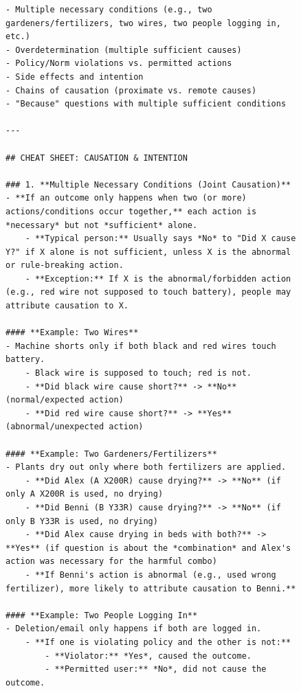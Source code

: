\begin{figure}[t]
\centering
\begin{tcolorbox}[title=Cheat Sheet for Causal Judgement (1/2), colback=gray!10, colframe=black!70, boxrule=0.5pt, top=0pt, bottom=0pt, left=0pt, right=0pt, arc=0.8mm, width=1.0\textwidth]
\scriptsize
\begin{lstlisting}
- Multiple necessary conditions (e.g., two gardeners/fertilizers, two wires, two people logging in, etc.)
- Overdetermination (multiple sufficient causes)
- Policy/Norm violations vs. permitted actions
- Side effects and intention
- Chains of causation (proximate vs. remote causes)
- "Because" questions with multiple sufficient conditions

---

## CHEAT SHEET: CAUSATION & INTENTION

### 1. **Multiple Necessary Conditions (Joint Causation)**
- **If an outcome only happens when two (or more) actions/conditions occur together,** each action is *necessary* but not *sufficient* alone.
    - **Typical person:** Usually says *No* to "Did X cause Y?" if X alone is not sufficient, unless X is the abnormal or rule-breaking action.
    - **Exception:** If X is the abnormal/forbidden action (e.g., red wire not supposed to touch battery), people may attribute causation to X.

#### **Example: Two Wires**
- Machine shorts only if both black and red wires touch battery.
    - Black wire is supposed to touch; red is not.
    - **Did black wire cause short?** -> **No** (normal/expected action)
    - **Did red wire cause short?** -> **Yes** (abnormal/unexpected action)

#### **Example: Two Gardeners/Fertilizers**
- Plants dry out only where both fertilizers are applied.
    - **Did Alex (A X200R) cause drying?** -> **No** (if only A X200R is used, no drying)
    - **Did Benni (B Y33R) cause drying?** -> **No** (if only B Y33R is used, no drying)
    - **Did Alex cause drying in beds with both?** -> **Yes** (if question is about the *combination* and Alex's action was necessary for the harmful combo)
    - **If Benni's action is abnormal (e.g., used wrong fertilizer), more likely to attribute causation to Benni.**

#### **Example: Two People Logging In**
- Deletion/email only happens if both are logged in.
    - **If one is violating policy and the other is not:**
        - **Violator:** *Yes*, caused the outcome.
        - **Permitted user:** *No*, did not cause the outcome.


\end{lstlisting}
\end{tcolorbox}
\end{figure}
